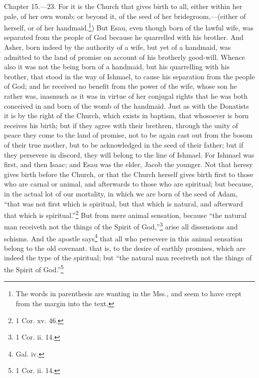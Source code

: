 Chapter 15.—23. For it is the Church that gives birth to all, either within her pale, of her own womb; or beyond it, of the seed of her bridegroom,—(either of herself, or of her handmaid.\footnote{\par  The words in parenthesis are wanting in the Mss., and seem to have crept from the margin into the text.}) But Esau, even though born of the lawful wife, was separated from the people of God because he quarrelled with his brother. And Asher, born indeed by the authority of a wife, but yet of a handmaid, was admitted to the land of promise on account of his brotherly good-will. Whence also it was not the being born of a handmaid, but his quarrelling with his brother, that stood in the way of Ishmael, to cause his separation from the people of God; and he received no benefit from the power of the wife, whose son he rather was, inasmuch as it was in virtue of her conjugal rights that he was both conceived in and born of the womb of the handmaid. Just as with the Donatists it is by the right of the Church, which exists in baptism, that whosoever is born receives his birth; but if they agree with their brethren, through the unity of peace they come to the land of promise, not to be again cast out from the bosom of their true mother, but to be acknowledged in the seed of their father; but if they persevere in discord, they will belong to the line of Ishmael. For Ishmael was first, and then Isaac; and Esau was the elder, Jacob the younger. Not that heresy gives birth before the Church, or that the Church herself gives birth first to those who are carnal or animal, and afterwards to those who are spiritual; but because, in the actual lot of our mortality, in which we are born of the seed of Adam, ``that was not first which is spiritual, but that which is natural, and afterward that which is spiritual.''\footnote{\par  1 Cor. xv. 46.} But from mere animal sensation, because ``the natural man receiveth not the things of the Spirit of God,''\footnote{\par  1 Cor. ii. 14.} arise all dissensions and schisms. And the apostle says\footnote{\par  Gal. iv.} that all who persevere in this animal sensation belong to the old covenant. that is, to the desire of earthly promises, which are indeed the type of the spiritual; but ``the natural man receiveth not the things of the Spirit of God.''\footnote{\par  1 Cor. ii. 14.}

